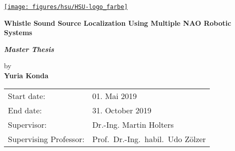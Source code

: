 
\begin{titlepage}
    \label{sec:title}

    \large
    \begin{center}

        \href{http://www.unibw-hamburg.de}
        {%
            \texttt{[image: figures/hsu/HSU-logo\_farbe]}
        }

        \vspace{2cm}

        \begin{minipage}{.9\linewidth}
            {\centering\Huge\bf Whistle Sound Source Localization Using Multiple NAO Robotic Systems\par}
        \end{minipage}

        \large


        \vspace{1.5cm}
        {\huge{\bf \it Master Thesis} %
        }

        \vspace{0.6cm}
        {
        \Large by \\[.5cm]
        {\bf \LARGE \huge Yuria Konda}\\[1.5cm]
        }

        \vfill
        \begin{tabular}{ll}
            Start date:            & 01. Mai 2019                       \\
            End date:              & 31. October 2019                   \\
            Supervisor:            & Dr.-Ing. Martin Holters            \\
            Supervising Professor: & Prof.~Dr.-Ing.~habil.~Udo Z\"olzer \\
        \end{tabular}
    \end{center}
    \vspace{2cm}

\end{titlepage}

